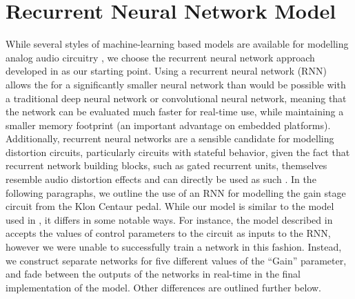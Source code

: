 \documentclass[twoside,a4paper]{article}
\begin{document}
\section{Recurrent Neural Network Model}
While several styles of machine-learning based models are available for
modelling analog audio circuitry \cite{WaveNetVA,NLML,MartinezReissDNN},
we choose the recurrent neural network approach developed in \cite{VArnn}
as our starting point. Using a recurrent neural network (RNN) allows the for a
significantly smaller neural network than would be possible with a traditional
deep neural network or convolutional neural network, meaning that the network
can be evaluated much faster for real-time use, while maintaining a smaller
memory footprint (an important advantage on embedded platforms). Additionally,
recurrent neural networks are a sensible candidate for modelling distortion
circuits, particularly circuits with stateful behavior, given the fact that
recurrent network building blocks, such as gated recurrent units, themselves
resemble audio distortion effects and can directly be used as such
\cite{chowdhury:complexNL:2020}.
\newline\newline
In the following paragraphs, we outline the use of an RNN for modelling
the gain stage circuit from the Klon Centaur pedal. While our model
is similar to the model used in \cite{VArnn}, it differs in some
notable ways. For instance, the model described in \cite{VArnn} accepts
the values of control parameters to the circuit as inputs to the RNN,
however we were unable to successfully train a network in this fashion.
Instead, we construct separate networks for five different values of the
``Gain'' parameter, and fade between the outputs of the networks in
real-time in the final implementation of the model. Other differences are
outlined further below.
\end{document}
